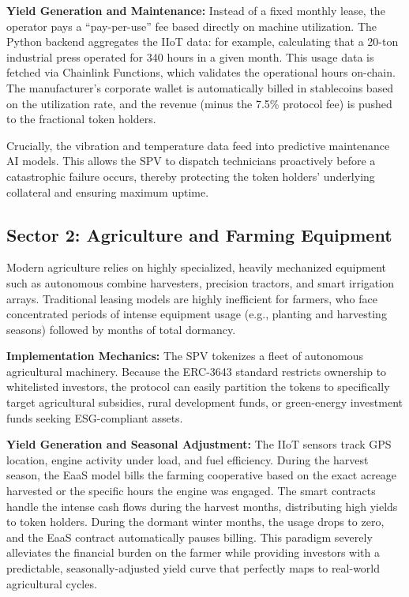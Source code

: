 \documentclass{Resources/bdlt-project}
\begin{document}
\textbf{Yield Generation and Maintenance:}
Instead of a fixed monthly lease, the operator pays a ``pay-per-use'' fee based directly on machine utilization. The Python backend aggregates the IIoT data: for example, calculating that a 20-ton industrial press operated for 340 hours in a given month. This usage data is fetched via Chainlink Functions, which validates the operational hours on-chain. The manufacturer's corporate wallet is automatically billed in stablecoins based on the utilization rate, and the revenue (minus the 7.5\% protocol fee) is pushed to the fractional token holders.

Crucially, the vibration and temperature data feed into predictive maintenance AI models. This allows the SPV to dispatch technicians proactively before a catastrophic failure occurs, thereby protecting the token holders' underlying collateral and ensuring maximum uptime.

\subsection{Sector 2: Agriculture and Farming Equipment}
Modern agriculture relies on highly specialized, heavily mechanized equipment such as autonomous combine harvesters, precision tractors, and smart irrigation arrays. Traditional leasing models are highly inefficient for farmers, who face concentrated periods of intense equipment usage (e.g., planting and harvesting seasons) followed by months of total dormancy.

\textbf{Implementation Mechanics:}
The SPV tokenizes a fleet of autonomous agricultural machinery. Because the ERC-3643 standard restricts ownership to whitelisted investors, the protocol can easily partition the tokens to specifically target agricultural subsidies, rural development funds, or green-energy investment funds seeking ESG-compliant assets.

\textbf{Yield Generation and Seasonal Adjustment:}
The IIoT sensors track GPS location, engine activity under load, and fuel efficiency. During the harvest season, the EaaS model bills the farming cooperative based on the exact acreage harvested or the specific hours the engine was engaged. The smart contracts handle the intense cash flows during the harvest months, distributing high yields to token holders. During the dormant winter months, the usage drops to zero, and the EaaS contract automatically pauses billing. This paradigm severely alleviates the financial burden on the farmer while providing investors with a predictable, seasonally-adjusted yield curve that perfectly maps to real-world agricultural cycles.
\end{document}
